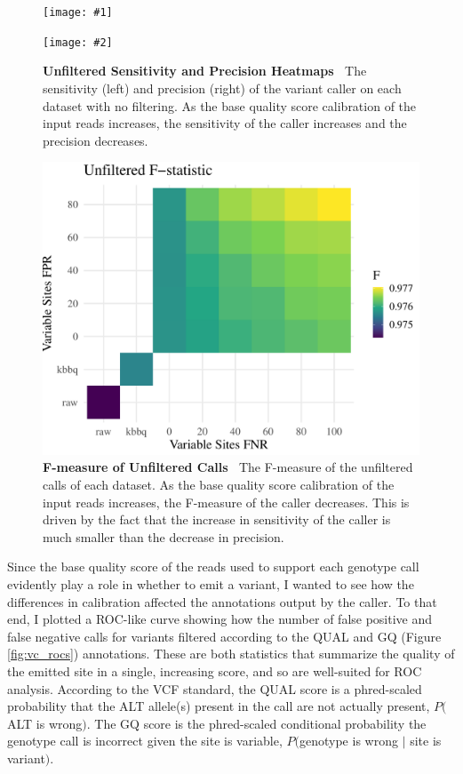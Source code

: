 \documentclass{report}
\newcommand{\titlecaption}[2]{\caption[#1]{\textbf{#1 \textbar\,} #2}}
\newcommand{\includetwo}[2]{\begin{minipage}{.475\textwidth}%
\texttt{[image: \#1]}%
\end{minipage}\hfill\begin{minipage}{.475\textwidth}%
\texttt{[image: \#2]}%
\end{minipage}}
\begin{document}
\begin{figure}
\centering
\includetwo{sensitivity.pdf}{precision.pdf}
\titlecaption{Unfiltered Sensitivity and Precision Heatmaps}{The sensitivity (left) and precision (right) of the variant caller on each dataset with no filtering. As the base quality score calibration of the input reads increases, the sensitivity of the caller increases and the precision decreases.}
\label{fig:vc_sens_prech}
\end{figure}

\begin{figure}
\centering
\includegraphics[width = .8\textwidth]{f_heatmap.pdf}
\titlecaption{F-measure of Unfiltered Calls}{The F-measure of the unfiltered calls of each dataset. As the base quality score calibration of the input reads increases, the F-measure of the caller decreases. This is driven by the fact that the increase in sensitivity of the caller is much smaller than the decrease in precision.}
\label{fig:vc_f_heatmap}
\end{figure}

\begin{outline}
\item Since the base quality score of the reads used to support each genotype call evidently play a role in whether to emit a variant, I wanted to see how the differences in calibration affected the annotations output by the caller. To that end, I plotted a ROC-like curve showing how the number of false positive and false negative calls for variants filtered according to the QUAL and GQ (Figure \ref{fig:vc_rocs}) annotations. These are both statistics that summarize the quality of the emitted site in a single, increasing score, and so are well-suited for ROC analysis. According to the VCF standard, the QUAL score is a phred-scaled probability that the ALT allele(s) present in the call are not actually present, $P($ALT is wrong$)$. The GQ score is the phred-scaled conditional probability the genotype call is incorrect given the site is variable, $P($genotype is wrong $|$ site is variant$)$.
\end{outline}
\end{document}
